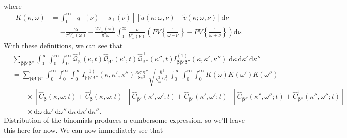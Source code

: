 \documentclass{article}
\begin{document}
where
\begin{equation}
\begin{split}
K(\kappa,\omega) &= \int_0^\infty[q_\perp(\nu) - s_\perp(\nu)][\tilde{u}(\kappa;\omega,\nu) - \tilde{v}(\kappa;\omega,\nu)]\mathrm{d}\nu\\
&= -\frac{2\mathrm{i}}{\pi V_\perp(\omega)} - \frac{2V_\perp(\omega)}{\pi^2\omega}\int_0^\infty\frac{\nu}{V_\perp^2(\nu)}\left(PV\left\{\frac{1}{\omega - \nu}\right\} - PV\left\{\frac{1}{\omega + \nu}\right\}\right)\mathrm{d}\nu.
\end{split}
\end{equation}
With these definitions, we can see that
\begin{equation}
\begin{split}
&\sum_{\bm{\beta}\bm{\beta}'\bm{\beta}''}\int_0^\infty\int_0^\infty\int_0^\infty\hat{\mathcal{Q}}_{\bm{\beta}}^\perp(\kappa,t)\hat{\mathcal{Q}}_{\bm{\beta}'}^\perp(\kappa',t)\hat{\mathcal{Q}}_{\bm{\beta}''}^\perp(\kappa'',t)I_{\bm{\beta}\bm{\beta}'\bm{\beta}''}^{(1)}(\kappa,\kappa',\kappa'')\;\mathrm{d}\kappa\,\mathrm{d}\kappa'\,\mathrm{d}\kappa''\\
&= \sum_{\bm{\beta}\bm{\beta}'\bm{\beta}''}\int_0^\infty\int_0^\infty\int_0^\infty I_{\bm{\beta}\bm{\beta}'\bm{\beta}''}^{(1)}(\kappa,\kappa',\kappa'')\frac{\kappa\kappa'\kappa''}{8\pi^3}\sqrt{\frac{\hbar^3}{\eta_m^3\Omega_\perp^3}}\int_0^\infty\int_0^\infty\int_0^\infty K(\omega)K(\omega')K(\omega'')\\
&\qquad\times\left[\hat{C}_{\bm{\beta}}(\kappa,\omega;t) + \hat{C}_{\bm{\beta}}^\dagger(\kappa,\omega;t)\right]\left[\hat{C}_{\bm{\beta}'}(\kappa',\omega';t) + \hat{C}_{\bm{\beta}'}^\dagger(\kappa',\omega';t)\right]\left[\hat{C}_{\bm{\beta}''}(\kappa'',\omega'';t) + \hat{C}_{\bm{\beta}''}^\dagger(\kappa'',\omega'';t)\right]\\
&\qquad\times\mathrm{d}\omega\,\mathrm{d}\omega'\,\mathrm{d}\omega''\,\mathrm{d}\kappa\,\mathrm{d}\kappa'\,\mathrm{d}\kappa''.
\end{split}
\end{equation}
Distribution of the binomials produces a cumbersome expression, so we'll leave this here for now. We can now immediately see that
\end{document}
